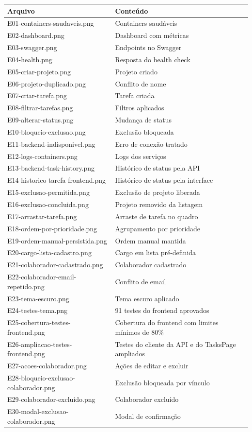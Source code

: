 \documentclass[12pt,a4paper,openany]{report}
\begin{document}
\begin{longtable}{>{\ttfamily}p{} p{}}
\toprule
\normalfont\textbf{Arquivo} & \normalfont\textbf{Conteúdo} \\
\midrule
\endhead
E01-containers-saudaveis.png & Containers saudáveis \\
E02-dashboard.png & Dashboard com métricas \\
E03-swagger.png & Endpoints no Swagger \\
E04-health.png & Resposta do health check \\
E05-criar-projeto.png & Projeto criado \\
E06-projeto-duplicado.png & Conflito de nome \\
E07-criar-tarefa.png & Tarefa criada \\
E08-filtrar-tarefas.png & Filtros aplicados \\
E09-alterar-status.png & Mudança de status \\
E10-bloqueio-exclusao.png & Exclusão bloqueada \\
E11-backend-indisponivel.png & Erro de conexão tratado \\
E12-logs-containers.png & Logs dos serviços \\
E13-backend-task-history.png & Histórico de status pela API \\
E14-historico-tarefa-frontend.png & Histórico de status pela interface \\
E15-exclusao-permitida.png & Exclusão de projeto liberada \\
E16-exclusao-concluida.png & Projeto removido da listagem \\
E17-arrastar-tarefa.png & Arraste de tarefa no quadro \\
E18-ordem-por-prioridade.png & Agrupamento por prioridade \\
E19-ordem-manual-persistida.png & Ordem manual mantida \\
E20-cargo-lista-cadastro.png & Cargo em lista pré-definida \\
E21-colaborador-cadastrado.png & Colaborador cadastrado \\
E22-colaborador-email-repetido.png & Conflito de email \\
E23-tema-escuro.png & Tema escuro aplicado \\
E24-testes-tema.png & 91 testes do frontend aprovados \\
E25-cobertura-testes-frontend.png & Cobertura do frontend com limites mínimos de 80\% \\
E26-ampliacao-testes-frontend.png & Testes do cliente da API e do TasksPage ampliados \\
E27-acoes-colaborador.png & Ações de editar e excluir \\
E28-bloqueio-exclusao-colaborador.png & Exclusão bloqueada por vínculo \\
E29-colaborador-excluido.png & Colaborador excluído \\
E30-modal-exclusao-colaborador.png & Modal de confirmação \\
\bottomrule
\end{longtable}
\end{document}
